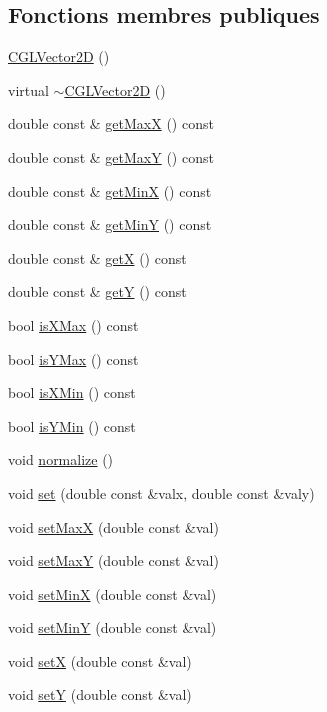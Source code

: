 \subsection*{Fonctions membres publiques}
\begin{DoxyCompactItemize}
\item 
\hyperlink{class_c_g_l_vector2_d_a777d33ddc05a95c0c4a56672d50a3138}{C\-G\-L\-Vector2\-D} ()
\item 
virtual \hyperlink{class_c_g_l_vector2_d_a93cf12a834078803bee4f19d42e09a02}{$\sim$\-C\-G\-L\-Vector2\-D} ()
\item 
double const \& \hyperlink{class_c_g_l_vector2_d_ae9a83a0a84269f3ddaae5339de94c17e}{get\-Max\-X} () const 
\item 
double const \& \hyperlink{class_c_g_l_vector2_d_a882866e67d9e60be3da4dd626c55967d}{get\-Max\-Y} () const 
\item 
double const \& \hyperlink{class_c_g_l_vector2_d_a2fee5114e405b765141db8a9e7d80424}{get\-Min\-X} () const 
\item 
double const \& \hyperlink{class_c_g_l_vector2_d_aecc92db660423309f4268293bc14ab85}{get\-Min\-Y} () const 
\item 
double const \& \hyperlink{class_c_g_l_vector2_d_a5f25e872259c579251336dfe0faf8701}{get\-X} () const 
\item 
double const \& \hyperlink{class_c_g_l_vector2_d_ad279638b74a0caac60632b169136688c}{get\-Y} () const 
\item 
bool \hyperlink{class_c_g_l_vector2_d_a61f90df90b91dcb413e9e1c72b8cbe1d}{is\-X\-Max} () const 
\item 
bool \hyperlink{class_c_g_l_vector2_d_a96ccb7ac910c4c8b1d390dba6306d79e}{is\-Y\-Max} () const 
\item 
bool \hyperlink{class_c_g_l_vector2_d_a9246e04841d8ef021f56d965d606bdd5}{is\-X\-Min} () const 
\item 
bool \hyperlink{class_c_g_l_vector2_d_a46b1951ce7743aaae330a44d40c38de9}{is\-Y\-Min} () const 
\item 
void \hyperlink{class_c_g_l_vector2_d_aca2031580314f92bf52c4e727247c8cd}{normalize} ()
\item 
void \hyperlink{class_c_g_l_vector2_d_a37b79a5ca7b3445df956e177f7c436fc}{set} (double const \&valx, double const \&valy)
\item 
void \hyperlink{class_c_g_l_vector2_d_a70d980ebd6f0dd51f389343b11664c98}{set\-Max\-X} (double const \&val)
\item 
void \hyperlink{class_c_g_l_vector2_d_a7ead92fc71694b48abd96685e9c41890}{set\-Max\-Y} (double const \&val)
\item 
void \hyperlink{class_c_g_l_vector2_d_a2619a94f4fe5227cf3d23a6cb001bb7f}{set\-Min\-X} (double const \&val)
\item 
void \hyperlink{class_c_g_l_vector2_d_af8c0f1ed3b2c3662071875ff89eab40e}{set\-Min\-Y} (double const \&val)
\item 
void \hyperlink{class_c_g_l_vector2_d_a22db1a511fae81b0d7a6766b6490dd8c}{set\-X} (double const \&val)
\item 
void \hyperlink{class_c_g_l_vector2_d_a4c89a21e28a86848c6b023ad60baef4c}{set\-Y} (double const \&val)
\end{DoxyCompactItemize}

